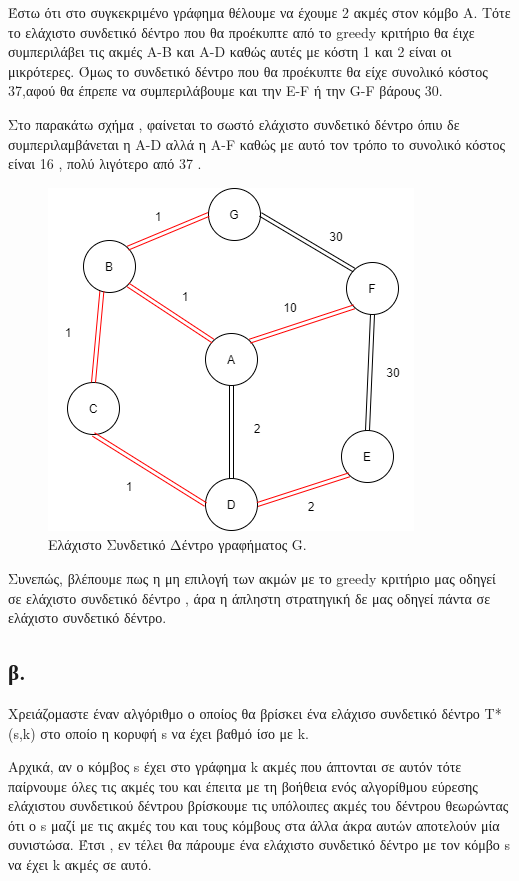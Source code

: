 \documentclass[12pt,a4paper]{article}
\begin{document}
\par Έστω ότι στο συγκεκριμένο γράφημα θέλουμε να έχουμε 2 ακμές στον κόμβο A. Τότε το ελάχιστο συνδετικό δέντρο που θα προέκυπτε από το greedy κριτήριο θα έιχε συμπεριλάβει τις ακμές A-B και A-D καθώς αυτές με κόστη 1 και 2 είναι οι μικρότερες. Όμως το συνδετικό δέντρο που θα προέκυπτε θα είχε συνολικό κόστος 37,αφού θα έπρεπε να συμπεριλάβουμε και την E-F ή την G-F βάρους 30. 
\par Στο παρακάτω σχήμα , φαίνεται το σωστό ελάχιστο συνδετικό δέντρο όπιυ δε συμπεριλαμβάνεται η A-D αλλά η A-F καθώς με αυτό τον τρόπο το συνολικό κόστος είναι 16 , πολύ λιγότερο από 37 .
\begin{figure}[h]
    \centering
    \includegraphics[scale = 0.6]{images/ask4.png}
    \caption{Ελάχιστο Συνδετικό Δέντρο γραφήματος G.}
    \label{fig2}
\end{figure}

\par Συνεπώς, βλέπουμε πως η μη επιλογή των ακμών με το greedy κριτήριο μας οδηγεί σε ελάχιστο συνδετικό δέντρο , άρα η άπληστη στρατηγική δε μας οδηγεί πάντα σε ελάχιστο συνδετικό δέντρο. 

\subsection*{β.}

\par Χρειάζομαστε έναν αλγόριθμο ο οποίος θα βρίσκει ένα ελάχισο συνδετικό δέντρο Τ*(s,k) στο οποίο η κορυφή s να έχει βαθμό ίσο με k.\\
\par Αρχικά, αν ο κόμβος s έχει στο γράφημα k ακμές που άπτονται σε αυτόν τότε παίρνουμε όλες τις ακμές του και έπειτα με τη βοήθεια ενός αλγορίθμου εύρεσης ελάχιστου συνδετικού δέντρου βρίσκουμε τις υπόλοιπες ακμές του δέντρου θεωρώντας ότι ο s μαζί με τις ακμές του  και τους κόμβους στα άλλα άκρα αυτών αποτελούν μία συνιστώσα. Έτσι , εν τέλει θα πάρουμε ένα ελάχιστο συνδετικό δέντρο με τον κόμβο s να έχει k ακμές σε αυτό.\\
\end{document}
